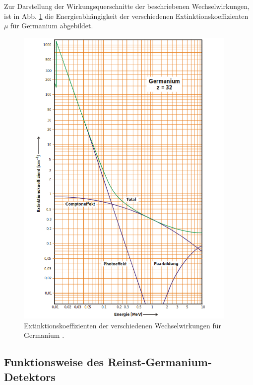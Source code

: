 Zur Darstellung der Wirkungsquerschnitte der beschriebenen Wechselwirkungen, ist in Abb. \ref{fig:mu_koeff}
die Energieabhängigkeit der verschiedenen Extinktionskoeffizienten $\mu$ für Germanium abgebildet.
\begin{figure}
  \centering
  \includegraphics[width=0.95\textwidth]{mu_koeff.png}
  \caption{Extinktionskoeffizienten der verschiedenen Wechselwirkungen für Germanium \cite{anleitungv18}.}
  \label{fig:mu_koeff}
\end{figure}

\subsection{Funktionsweise des Reinst-Germanium-Detektors}

